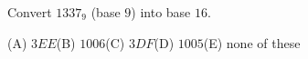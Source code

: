 Convert $1337_9$ (base $9$) into base $16$.

(A) $3EE$\qquad (B) $1006$\qquad (C) $3DF$\qquad (D) $1005$\qquad (E) none of these
